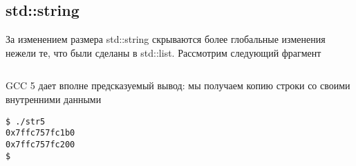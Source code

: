 \documentclass[14pt,a4paper]{article}
\begin{document}






\subsection{std::string}

За изменением размера std::string скрываются более глобальные
изменения нежели те, что были сделаны в std::list. 
Рассмотрим следующий фрагмент
\inputminted{c++}{./src/str.cpp}

GCC 5 дает вполне предсказуемый вывод: мы получаем копию строки со
своими внутренними данными
\begin{verbatim}
$ ./str5
0x7ffc757fc1b0
0x7ffc757fc200
$
\end{verbatim}
\end{document}
